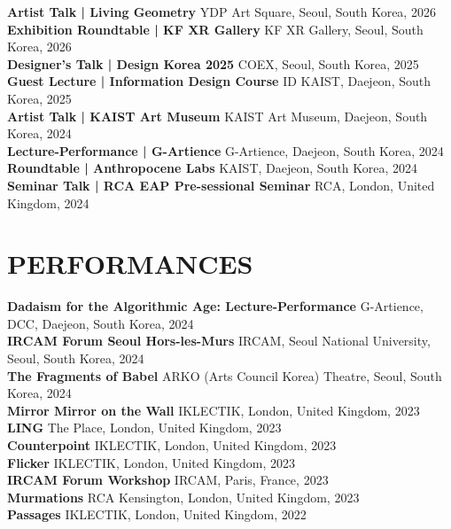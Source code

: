 \documentclass[a4paper,9pt]{extarticle}
\begin{document}
\noindent
\textbf{Artist Talk | Living Geometry} \hfill YDP Art Square, Seoul, South Korea, 2026\\
\textbf{Exhibition Roundtable | KF XR Gallery} \hfill KF XR Gallery, Seoul, South Korea, 2026\\
\textbf{Designer's Talk | Design Korea 2025} \hfill COEX, Seoul, South Korea, 2025\\
\textbf{Guest Lecture | Information Design Course} \hfill ID KAIST, Daejeon, South Korea, 2025\\
\textbf{Artist Talk | KAIST Art Museum} \hfill KAIST Art Museum, Daejeon, South Korea, 2024\\
\textbf{Lecture-Performance | G-Artience} \hfill G-Artience, Daejeon, South Korea, 2024\\
\textbf{Roundtable | Anthropocene Labs} \hfill KAIST, Daejeon, South Korea, 2024\\
\textbf{Seminar Talk | RCA EAP Pre-sessional Seminar} \hfill RCA, London, United Kingdom, 2024\\






\section*{PERFORMANCES}

\noindent
\textbf{Dadaism for the Algorithmic Age: Lecture-Performance} \hfill G-Artience, DCC, Daejeon, South Korea, 2024\\
\textbf{IRCAM Forum Seoul Hors-les-Murs} \hfill IRCAM, Seoul National University, Seoul, South Korea, 2024\\
\textbf{The Fragments of Babel} \hfill ARKO (Arts Council Korea) Theatre, Seoul, South Korea, 2024\\
\textbf{Mirror Mirror on the Wall} \hfill IKLECTIK, London, United Kingdom, 2023\\
\textbf{LING} \hfill The Place, London, United Kingdom, 2023\\
\textbf{Counterpoint} \hfill IKLECTIK, London, United Kingdom, 2023\\
\textbf{Flicker} \hfill IKLECTIK, London, United Kingdom, 2023\\
\textbf{IRCAM Forum Workshop} \hfill IRCAM, Paris, France, 2023\\
\textbf{Murmations} \hfill RCA Kensington, London, United Kingdom, 2023\\
\textbf{Passages} \hfill IKLECTIK, London, United Kingdom, 2022\\
\end{document}
